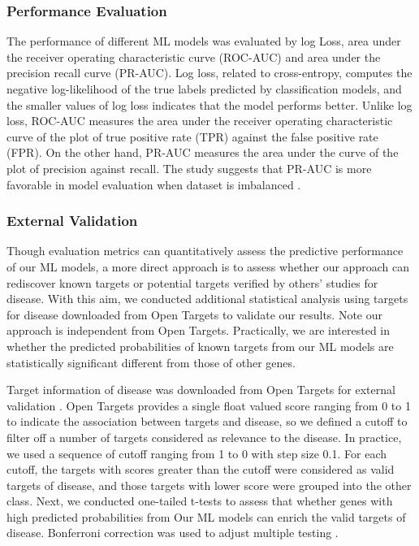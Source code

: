     \subsubsection{Performance Evaluation}
      The performance of different ML models was evaluated by log Loss, area under the receiver operating characteristic curve (ROC-AUC) and area under the precision recall curve (PR-AUC). Log loss, related to cross-entropy, computes the negative log-likelihood of the true labels predicted by classification models, and the smaller values of log loss indicates that the model performs better. Unlike log loss, ROC-AUC measures the area under the receiver operating characteristic curve of the plot of true positive rate (TPR) against the false positive rate (FPR). On the other hand, PR-AUC measures the area under the curve of the plot of precision against recall. The study suggests that PR-AUC is more favorable in model evaluation when dataset is imbalanced \cite{davis2006relationship}.
  
    \subsubsection{External Validation}
      Though evaluation metrics can quantitatively assess the predictive performance of our ML models, a more direct approach is to assess whether our approach can rediscover known targets or potential targets verified by others' studies for disease. With this aim, we conducted additional statistical analysis using targets for disease downloaded from Open Targets \cite{koscielny2017open} to validate our results. Note our approach is independent from Open Targets. Practically, we are interested in whether the predicted probabilities of known targets from our ML models are statistically significant different from those of other genes.

      Target information of disease was downloaded from Open Targets for external validation \cite{koscielny2017open}. Open Targets provides a single float valued score ranging from 0 to 1 to indicate the association between targets and disease, so we defined a cutoff to filter off a number of targets considered as relevance to the disease. In practice, we used a sequence of cutoff ranging from 1 to 0 with step size 0.1. For each cutoff, the targets with scores greater than the cutoff were considered as valid targets of disease, and those targets with lower score were grouped into the other class. Next, we conducted one-tailed t-tests to assess that whether genes with high predicted probabilities from Our ML models can enrich the valid targets of disease. Bonferroni correction was used to adjust multiple testing \cite{benjamini1995controlling} .
  
